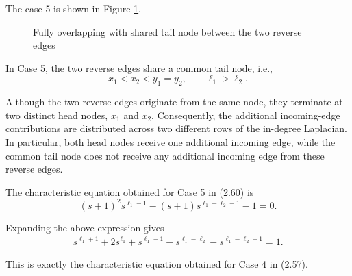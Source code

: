 \documentclass[11pt,a4paper]{article}
\begin{document}
The case 5 is shown in Figure \ref{Case5}.
\begin{figure}[H]
		\centering
		\caption{Fully overlapping with shared tail node between the two reverse edges}
		\label{Case5}
	\end{figure}


In Case 5, the two reverse edges share a common tail node, i.e.,
\begin{equation}
    x_1 < x_2 < y_1 = y_2,
    \qquad \ell_1 > \ell_2.
\end{equation}

Although the two reverse edges originate from the same node, they terminate at two distinct head nodes, $x_1$ and $x_2$. Consequently, the additional incoming-edge contributions are distributed across two different rows of the in-degree Laplacian. In particular, both head nodes receive one additional incoming edge, while the common tail node does not receive any additional incoming edge from these reverse edges.

The characteristic equation obtained for Case 5 in (2.60) is
\begin{equation}
    (s+1)^2s^{\ell_1-1}
    -(s+1)s^{\ell_1-\ell_2-1}-1=0.
    \tag{2.60}
\end{equation}

Expanding the above expression gives
\begin{equation}
\begin{aligned}
    s^{\ell_1+1}
    +2s^{\ell_1}
    +s^{\ell_1-1}
    -s^{\ell_1-\ell_2}
    -s^{\ell_1-\ell_2-1}
    =1.
\end{aligned}
\tag{2.60a}
\end{equation}

This is exactly the characteristic equation obtained for Case 4 in (2.57).
\end{document}
